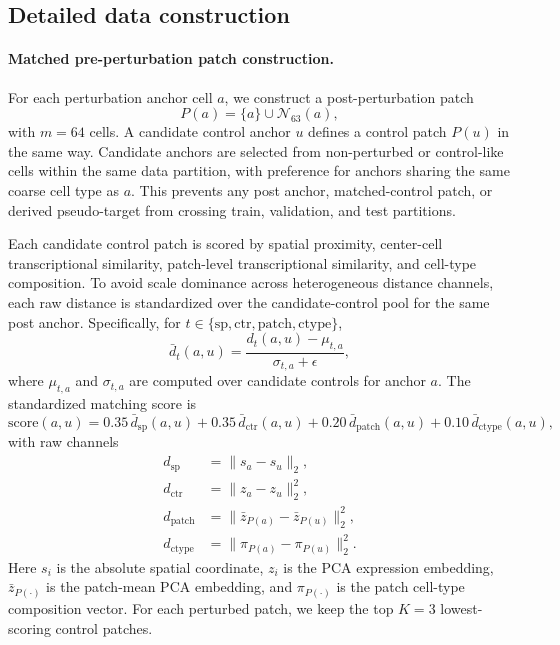 \documentclass[sigconf,review,balance=false]{acmart}
\begin{document}
\subsection{Detailed data construction}
\label{app:detailed_data_construction}

\paragraph{Matched pre-perturbation patch construction.}
For each perturbation anchor cell $a$, we construct a post-perturbation patch
\[
P(a)=\{a\}\cup\mathcal N_{63}(a),
\]
with $m=64$ cells. A candidate control anchor $u$ defines a control patch $P(u)$ in the same way. Candidate anchors are selected from non-perturbed or control-like cells within the same data partition, with preference for anchors sharing the same coarse cell type as $a$. This prevents any post anchor, matched-control patch, or derived pseudo-target from crossing train, validation, and test partitions.

Each candidate control patch is scored by spatial proximity, center-cell transcriptional similarity, patch-level transcriptional similarity, and cell-type composition. To avoid scale dominance across heterogeneous distance channels, each raw distance is standardized over the candidate-control pool for the same post anchor. Specifically, for $t\in\{\mathrm{sp},\mathrm{ctr},\mathrm{patch},\mathrm{ctype}\}$,
\[
\bar d_t(a,u)=\frac{d_t(a,u)-\mu_{t,a}}{\sigma_{t,a}+\epsilon},
\]
where $\mu_{t,a}$ and $\sigma_{t,a}$ are computed over candidate controls for anchor $a$. The standardized matching score is
\[
\mathrm{score}(a,u)
=
0.35\,\bar d_{\mathrm{sp}}(a,u)
+
0.35\,\bar d_{\mathrm{ctr}}(a,u)
+
0.20\,\bar d_{\mathrm{patch}}(a,u)
+
0.10\,\bar d_{\mathrm{ctype}}(a,u),
\]
with raw channels
\[
\begin{aligned}
d_{\mathrm{sp}}
&=\|s_a-s_u\|_2,\\
d_{\mathrm{ctr}}
&=\|z_a-z_u\|_2^2,\\
d_{\mathrm{patch}}
&=\|\bar z_{P(a)}-\bar z_{P(u)}\|_2^2,\\
d_{\mathrm{ctype}}
&=\|\pi_{P(a)}-\pi_{P(u)}\|_2^2 .
\end{aligned}
\]
Here $s_i$ is the absolute spatial coordinate, $z_i$ is the PCA expression embedding, $\bar z_{P(\cdot)}$ is the patch-mean PCA embedding, and $\pi_{P(\cdot)}$ is the patch cell-type composition vector. For each perturbed patch, we keep the top $K=3$ lowest-scoring control patches.
\end{document}
